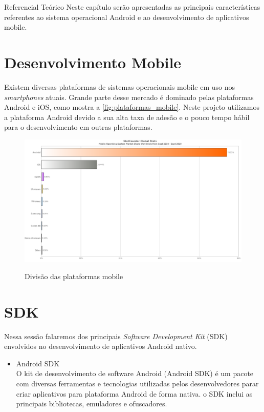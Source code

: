 \documentclass[
	12pt,				%
	openany,			%
	twoside,			%
	a4paper,			%
	english,			%
	french,				%
	spanish,			%
	brazil				%
	]{abntex2}
\begin{document}
\begin{chapter}{Referencial Teórico}
Neste capítulo serão apresentadas as principais características referentes ao sistema operacional Android e ao desenvolvimento de aplicativos mobile.
\section{Desenvolvimento Mobile}
Existem diversas plataformas de sistemas operacionais mobile em uso nos \textit{smartphones} atuais. Grande parte desse mercado é dominado pelas plataformas Android e iOS, como mostra a \autoref{fig:plataformas_mobile}. Neste projeto utilizamos a plataforma Android devido a sua alta taxa de adesão e o pouco tempo hábil para o desenvolvimento em outras plataformas.

\begin{figure}[h]
\centering
   \caption{Divisão das plataformas mobile}
   \includegraphics[scale=0.4]{media/grafico_plataformas.png}
     \label{fig:plataformas_mobile}
\end{figure}

\newpage
\section{SDK}
Nessa sessão falaremos dos principais \textit{Software Development Kit} (SDK) envolvidos no desenvolvimento de aplicativos Android nativo.

\begin{itemize}
\item{Android SDK} \\
O kit de desenvolvimento de software Android (Android SDK) é um pacote com diversas ferramentas e tecnologias utilizadas pelos desenvolvedores parar criar aplicativos para plataforma Android de forma nativa. o SDK inclui as principais bibliotecas, emuladores e ofuscadores.
  

\end{itemize}
\end{chapter}
\end{document}
